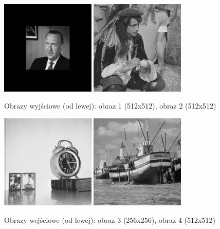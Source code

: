 \documentclass[final,a4paper,openany,12pt]{mwbk}
\begin{document}
\begin{figure}[H]
	\begin{center}
		\includegraphics[width=0.4\textwidth]{gentelman_gray_unificationGeo_result}
		\includegraphics[width=0.4\textwidth]{pirate_gray_unificationGeo_result}
	\end{center}
	\caption{Obrazy wyjściowe (od lewej): obraz 1 (512x512), obraz 2 (512x512)}
\end{figure}

\begin{figure}[H]
	\begin{center}
		\includegraphics[width=0.4\textwidth]{clock_gray}
		\includegraphics[width=0.4\textwidth]{boat_gray}
	\end{center}
	\caption{Obrazy wejściowe (od lewej): obraz 3 (256x256), obraz 4 (512x512)}
\end{figure}
\end{document}
